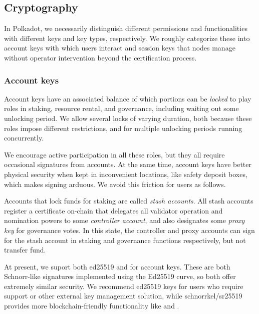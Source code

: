 \subsection{Cryptography}\label{sec:crypto}

In Polkadot, we necessarily distinguish  different permissions and functionalities with different keys and key types, respectively.  We roughly categorize these into account keys with which users interact and session keys that nodes manage without operator intervention beyond the certification process.

\subsubsection{Account keys}

Account keys have an associated balance of which portions can be {\em locked} to play roles in staking, resource rental, and governance, including waiting out some unlocking period.  We allow several locks of varying duration, both because these roles impose different restrictions, and for multiple unlocking periods running concurrently. 

We encourage active participation in all these roles, but they all require occasional signatures from accounts.  At the same time, account keys have better physical security when kept in inconvenient locations, like safety deposit boxes, which makes signing arduous.  We avoid this friction for users as follows.

Accounts that lock funds for staking are called {\em stash accounts}.  All stash accounts register a certificate on-chain that delegates all validator operation and nomination powers to some {\em controller account}, and also designates some {\em proxy key} for governance votes.  In this state, the controller and proxy accounts can sign for the stash account in staking and governance functions respectively, but not transfer fund.  

\smallskip

At present, we suport both ed25519 and  for account keys.  These are both Schnorr-like signatures implemented using the Ed25519 curve, so both offer extremely similar security.  We recommend ed25519 keys for users who require  support or other external key management solution, while schnorrkel/sr25519 provides more blockchain-friendly functionality like  and .  

